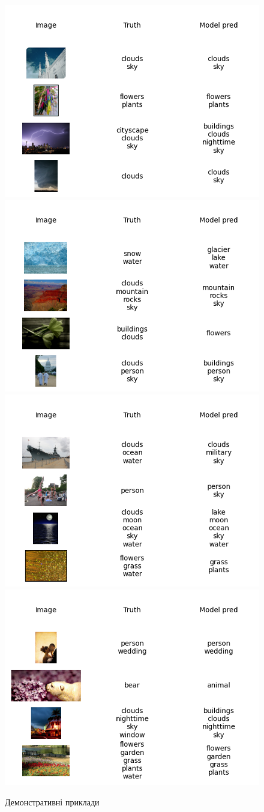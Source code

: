 \documentclass{udstu}
\begin{document}
\begin{figure}[h]
\centering
	\subcaptionbox{}
		{\includegraphics[width=0.495\linewidth]{PNG/showcase-1-20}}
		\label{figure:showcase-1}
	\subcaptionbox{}
		{\includegraphics[width=0.495\linewidth]{PNG/showcase-2-30}}
		\label{figure:showcase-2}
	\subcaptionbox{}
		{\includegraphics[width=0.495\linewidth]{PNG/showcase-3-40}}
 	\subcaptionbox{}
 		{\includegraphics[width=0.495\linewidth]{PNG/showcase-4-70}}
\caption{Демонстративні приклади}
\end{figure}
\end{document}
